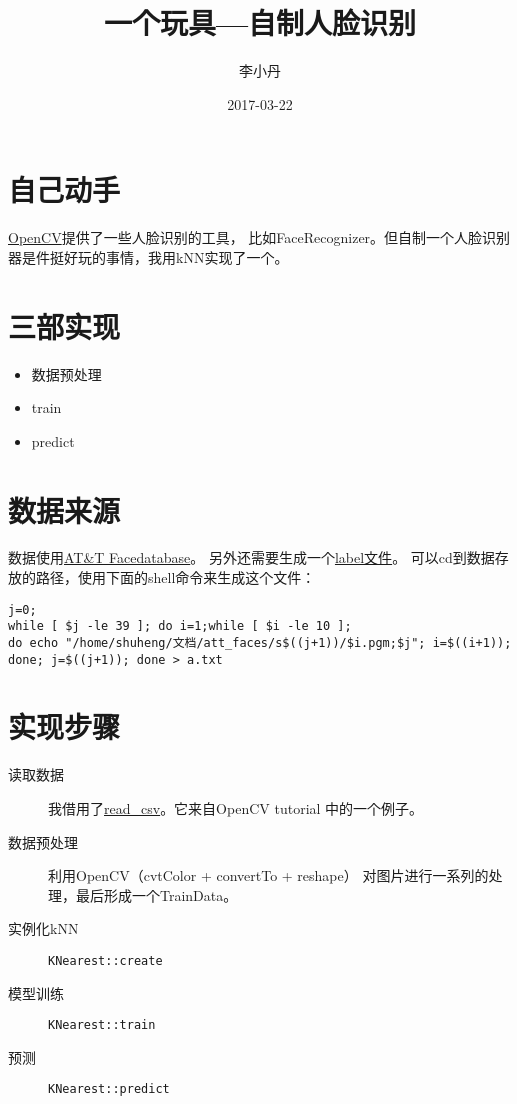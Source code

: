 \documentclass[a4paper]{article}
\begin{document}
\begin{CJK}{UTF8}{gkai}
	\title{一个玩具---自制人脸识别}
	\author{李小丹}
	\date{2017-03-22}

	\maketitle
\end{CJK}

\begin{CJK}{UTF8}{gbsn}

	\section*{自己动手}
	\href{http://opencv.org/}{OpenCV}提供了一些人脸识别的工具，
	比如FaceRecognizer。但自制一个人脸识别器是件挺好玩的事情，我用kNN实现了一个。

	\section*{三部实现}
	\begin{itemize}
		\item 数据预处理
		\item train
		\item predict
	\end{itemize}

	\section*{数据来源}
	数据使用\href{http://www.cl.cam.ac.uk/research/dtg/attarchive/facedatabase.html}
	{AT\&T Facedatabase}。
	另外还需要生成一个\href{http://docs.opencv.org/3.1.0/da/d60/tutorial_face_main.html#tutorial_face_prepare}{label文件}。
	可以cd到数据存放的路径，使用下面的shell命令来生成这个文件：
	\begin{verbatim}
j=0;
while [ $j -le 39 ]; do i=1;while [ $i -le 10 ];
do echo "/home/shuheng/文档/att_faces/s$((j+1))/$i.pgm;$j"; i=$((i+1));
done; j=$((j+1)); done > a.txt
	\end{verbatim}

	\section*{实现步骤}
	\begin{description}
		\item [读取数据] 我借用了\href{http://docs.opencv.org/3.1.0/da/d60/tutorial_face_main.html#tutorial_face_fisherfaces_use}
			{read\_csv}。它来自OpenCV tutorial \cite{tutorial}中的一个例子。
		\item [数据预处理] 利用OpenCV（cvtColor + convertTo + reshape）
			对图片进行一系列的处理，最后形成一个TrainData\cite{traindata}。
		\item [实例化kNN] {\verb|KNearest::create|}\cite{knn}
		\item [模型训练]  {\verb|KNearest::train|}\cite{knn}
		\item [预测]   {\verb|KNearest::predict|}\cite{knn}
	\end{description}


\end{CJK}
\end{document}
